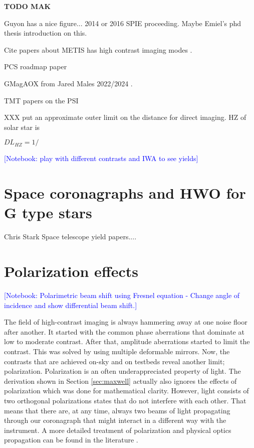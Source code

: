 \documentclass[letterpaper]{ar-1col}
\newcommand{\notebooksuggestion}[1]{\textcolor{blue}{[Notebook: #1]}}
\begin{document}
{\bf TODO MAK}

Guyon has a nice figure... 2014 or 2016 SPIE proceeding. Maybe Emiel's phd thesis introduction on this.

Cite papers about METIS \citep{Brandl21} has high contrast imaging modes \citep{Kenworthy16,Carlomagno20}.

PCS roadmap paper \citep{Kasper21}

GMagAOX from Jared Males 2022/2024 \citep{Males22}.

TMT papers on the PSI \citet{Jensen-Clem22,Fitzgerald22}


XXX put an approximate outer limit on the distance for direct imaging. HZ of solar star is 

$DL_{HZ} = 1/$

\notebooksuggestion{play with different contrasts and IWA to see yields}

\lipsum[2]

\section{Space coronagraphs and HWO for G type stars}

Chris Stark Space telescope yield papers...\citep{Stark14,Stark24}.

\lipsum[2-4]



\section{Polarization effects} 

\notebooksuggestion{Polarimetric beam shift using Fresnel equation - Change angle of incidence and show differential beam shift.}

The field of high-contrast imaging is always hammering away at one noise floor after another. It started with the common phase aberrations that dominate at low to moderate contrast. After that, amplitude aberrations started to limit the contrast. This was solved by using multiple deformable mirrors. Now, the contrasts that are achieved on-sky and on testbeds reveal another limit; polarization. Polarization is an often underappreciated property of light. The derivation shown in Section \ref{sec:maxwell} actually also ignores the effects of polarization which was done for mathematical clarity. However, light consists of two orthogonal polarizations states that do not interfere with each other. That means that there are, at any time, always two beams of light propagating through our coronagraph that might interact in a different way with the instrument. A more detailed treatment of polarization and physical optics propagation can be found in the literature \citep{McLeod14}.
\end{document}
